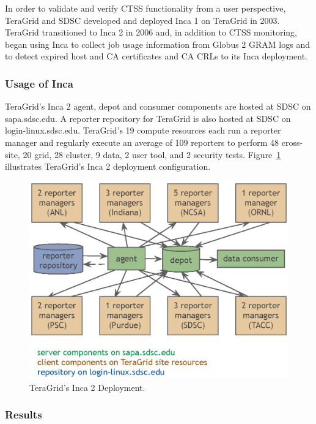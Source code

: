 \documentclass[times,10pt,twocolumn]{article}
\begin{document}
In order to validate and verify CTSS functionality from a user perspective,
TeraGrid and SDSC developed and deployed Inca 1 on TeraGrid in 2003. TeraGrid
transitioned to Inca 2 in 2006 and, in addition to CTSS monitoring, began using
Inca to collect job usage information from Globus 2 GRAM logs and to detect
expired host and CA certificates and CA CRLs to its Inca deployment.

\subsubsection{Usage of Inca}


TeraGrid's Inca 2 agent, depot and consumer components are hosted at SDSC on 
sapa.sdsc.edu.  A reporter repository for TeraGrid is also hosted
at SDSC on login-linux.sdsc.edu.  TeraGrid's 19 compute resources
each run a reporter manager and regularly execute an average of 109 reporters
to perform 48 cross-site, 20 grid, 28 cluster, 9 data, 2 user tool, and 2
security tests.  Figure~\ref{tg_deploy_fig} illustrates TeraGrid's Inca 2 
deployment configuration.

\begin{figure}[hbt]
  \centering
  \includegraphics[scale=0.6]{tg-deploy.eps}
  \caption{TeraGrid's Inca 2 Deployment.}
  \label{tg_deploy_fig}
\end{figure}

\subsubsection{Results}
\end{document}
